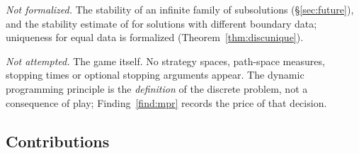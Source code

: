 \documentclass[11pt,reqno]{amsart}
\theoremstyle{plain}
\theoremstyle{definition}
\begin{document}
\emph{Not formalized.} The stability of an infinite family of subsolutions
(\S\ref{sec:future}), and the stability estimate of \cite[Theorem~2.2]{LPS14}
for solutions with different boundary data; uniqueness for equal data is
formalized (Theorem~\ref{thm:discunique}).

\emph{Not attempted.} The game itself. No strategy spaces, path-space
measures, stopping times or optional stopping arguments appear. The dynamic
programming principle is the \emph{definition} of the discrete problem, not a
consequence of play; Finding~\ref{find:mpr} records the price of that decision.

\subsection{Contributions}
\end{document}
